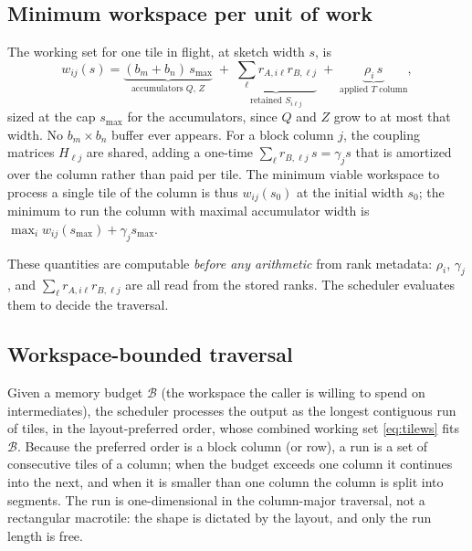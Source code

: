 \documentclass[11pt]{article}
\begin{document}
\subsection{Minimum workspace per unit of work}
\label{sec:minws}

The working set for one tile in flight, at sketch width $s$, is
\begin{equation}
\label{eq:tilews}
w_{ij}(s)=
\underbrace{(b_m+b_n)\,s_{\max}}_{\text{accumulators }Q,\,Z}
\;+\;
\underbrace{\textstyle\sum_\ell r_{A,i\ell}r_{B,\ell j}}_{\text{retained }S_{i\ell j}}
\;+\;
\underbrace{\rho_i\,s}_{\text{applied }T\text{ column}},
\end{equation}
sized at the cap $s_{\max}$ for the accumulators, since $Q$ and $Z$ grow to at
most that width. No $b_m\times b_n$ buffer ever appears. For a block column $j$,
the coupling matrices $H_{\ell j}$ are shared, adding a one-time
$\sum_\ell r_{B,\ell j}\,s=\gamma_j s$ that is amortized over the column rather
than paid per tile. The minimum viable workspace to process a single tile of the
column is thus $w_{ij}(s_0)$ at the initial width $s_0$; the minimum to run the
column with maximal accumulator width is $\max_i w_{ij}(s_{\max})+\gamma_j
s_{\max}$.

These quantities are computable \emph{before any arithmetic} from rank metadata:
$\rho_i$, $\gamma_j$, and $\sum_\ell r_{A,i\ell}r_{B,\ell j}$ are all read from
the stored ranks. The scheduler evaluates them to decide the traversal.

\subsection{Workspace-bounded traversal}
\label{sec:traversal}

Given a memory budget $\mathcal B$ (the workspace the caller is willing to spend
on intermediates), the scheduler processes the output as the longest contiguous
run of tiles, in the layout-preferred order, whose combined working set
\eqref{eq:tilews} fits $\mathcal B$. Because the preferred order is a block
column (or row), a run is a set of consecutive tiles of a column; when the budget
exceeds one column it continues into the next, and when it is smaller than one
column the column is split into segments. The run is one-dimensional in the
column-major traversal, not a rectangular macrotile: the shape is dictated by the
layout, and only the run length is free.
\end{document}
